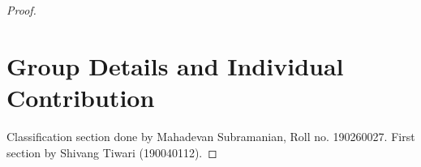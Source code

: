 \documentclass[11pt, twosides]{article}
\begin{document}
\begin{proof}
\section{Group Details and Individual Contribution}
Classification section done by Mahadevan Subramanian, Roll no. 190260027. First section by Shivang Tiwari (190040112).
\end{proof}
\end{document}
